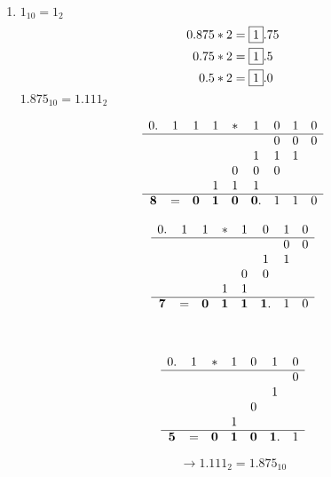 \documentclass{article}
\begin{document}
\begin{enumerate}[a)]
\begin{enumerate}[1)]
  \item
    $1_{10} = 1_{2}$
    \begin{align*}
      0.875 * 2 &= \framebox{1}.75 \\
      0.75  * 2 &= \framebox{1}.5 \\
      0.5   * 2 &= \framebox{1}.0 \\
    \end{align*}
    $1.875_{10} = 1.111_{2}$
    
    \begin{minipage}[t]{.4\textwidth}
      \[
        \begin{array}{cccc cccc c}
          0.&1&1&1&*&1&0&1&0 \\
          \cline{0-8}
            & & & & & &0&0&0 \\
            & & & & &1&1&1 \\
            & & & &0&0&0 \\
            & & &1&1&1 \\
          \cline{0-8}
          \bm{8}&=&\bm{0}&\bm{1}&\bm{0}&\bm{0}.&1&1&0 \\
        \end{array}
      \]
    \end{minipage}
    \hfill
    \begin{minipage}[t]{.4\textwidth}
      \[
        \begin{array}{cccc cccc}
          0.&1&1&*&1&0&1&0 \\
          \cline{0-7}
            & & & & & &0&0 \\
            & & & & &1&1 \\
            & & & &0&0 \\
            & & &1&1 \\
          \cline{0-7}
          \bm{7}&=&\bm{0}&\bm{1}&\bm{1}&\bm{1}.&1&0 \\
        \end{array}
      \]
    \end{minipage}  \\
    
    \begin{minipage}{.4\textwidth}
      \[
        \begin{array}{cccc ccc}
          0.&1&*&1&0&1&0 \\
          \cline{0-6}
            & & & & & &0 \\
            & & & & &1 \\
            & & & &0 \\
            & & &1 \\
          \cline{0-6}
          \bm{5}&=&\bm{0}&\bm{1}&\bm{0}&\bm{1}.&1 \\
        \end{array}
      \]
    \end{minipage}
    \hfill
    \begin{minipage}{.4\textwidth}
      \[
        \rightarrow 1.111_{2} = 1.875_{10}
      \]
    \end{minipage}
    

\end{enumerate}
\end{enumerate}
\end{document}
